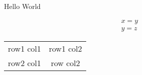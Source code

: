 \documentclass[]{article}
\begin{document}
\begin{center} Hello World \end{center}
\begin{align*} x = y\\ y = z \end{align*}

\begin{tabular}[]{cc}
  row1 col1 & row1 col2 \\
  row2 col1 & row col2
\end{tabular}
\end{document}
